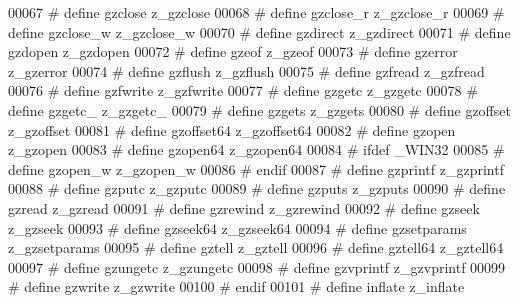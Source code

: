 \begin{DoxyCode}
00067 \textcolor{preprocessor}{#    define gzclose               z\_gzclose}
00068 \textcolor{preprocessor}{#    define gzclose\_r             z\_gzclose\_r}
00069 \textcolor{preprocessor}{#    define gzclose\_w             z\_gzclose\_w}
00070 \textcolor{preprocessor}{#    define gzdirect              z\_gzdirect}
00071 \textcolor{preprocessor}{#    define gzdopen               z\_gzdopen}
00072 \textcolor{preprocessor}{#    define gzeof                 z\_gzeof}
00073 \textcolor{preprocessor}{#    define gzerror               z\_gzerror}
00074 \textcolor{preprocessor}{#    define gzflush               z\_gzflush}
00075 \textcolor{preprocessor}{#    define gzfread               z\_gzfread}
00076 \textcolor{preprocessor}{#    define gzfwrite              z\_gzfwrite}
00077 \textcolor{preprocessor}{#    define gzgetc                z\_gzgetc}
00078 \textcolor{preprocessor}{#    define gzgetc\_               z\_gzgetc\_}
00079 \textcolor{preprocessor}{#    define gzgets                z\_gzgets}
00080 \textcolor{preprocessor}{#    define gzoffset              z\_gzoffset}
00081 \textcolor{preprocessor}{#    define gzoffset64            z\_gzoffset64}
00082 \textcolor{preprocessor}{#    define gzopen                z\_gzopen}
00083 \textcolor{preprocessor}{#    define gzopen64              z\_gzopen64}
00084 \textcolor{preprocessor}{#    ifdef \_WIN32}
00085 \textcolor{preprocessor}{#      define gzopen\_w              z\_gzopen\_w}
00086 \textcolor{preprocessor}{#    endif}
00087 \textcolor{preprocessor}{#    define gzprintf              z\_gzprintf}
00088 \textcolor{preprocessor}{#    define gzputc                z\_gzputc}
00089 \textcolor{preprocessor}{#    define gzputs                z\_gzputs}
00090 \textcolor{preprocessor}{#    define gzread                z\_gzread}
00091 \textcolor{preprocessor}{#    define gzrewind              z\_gzrewind}
00092 \textcolor{preprocessor}{#    define gzseek                z\_gzseek}
00093 \textcolor{preprocessor}{#    define gzseek64              z\_gzseek64}
00094 \textcolor{preprocessor}{#    define gzsetparams           z\_gzsetparams}
00095 \textcolor{preprocessor}{#    define gztell                z\_gztell}
00096 \textcolor{preprocessor}{#    define gztell64              z\_gztell64}
00097 \textcolor{preprocessor}{#    define gzungetc              z\_gzungetc}
00098 \textcolor{preprocessor}{#    define gzvprintf             z\_gzvprintf}
00099 \textcolor{preprocessor}{#    define gzwrite               z\_gzwrite}
00100 \textcolor{preprocessor}{#  endif}
00101 \textcolor{preprocessor}{#  define inflate               z\_inflate}

\end{DoxyCode}
